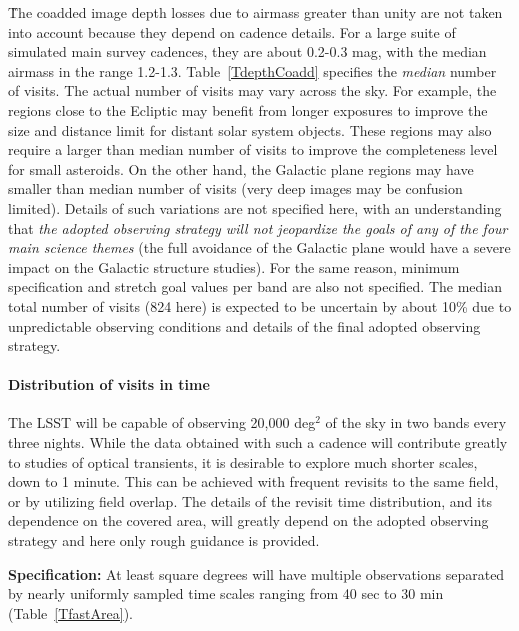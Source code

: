 \G{The coadded image depth losses due to airmass greater than unity are not
taken into account because they depend on cadence details. For a large suite
of simulated main survey cadences, they are about 0.2-0.3 mag, with the median airmass in
the range 1.2-1.3.}
Table~\ref{TdepthCoadd} specifies the {\it median} number of visits. The actual
number of visits may vary across the sky. For example, the regions close to
the Ecliptic may benefit from longer exposures to improve the size and distance
limit for distant solar system objects. These regions may also require a
larger than median number of visits to improve
the completeness level for small asteroids. On the other hand, the Galactic
plane regions may have smaller than median number of visits (\eg very deep
images may be confusion limited). Details of such variations are not specified
here, with an understanding that {\it the adopted observing strategy will not
jeopardize the goals of any of the four main science themes} (\eg the full
avoidance of the Galactic plane would have a severe impact on the Galactic
structure studies). For the same reason, minimum specification
and stretch goal values per band are also not specified. The median total number of visits
(824 here) is expected to be uncertain by about 10\% due to unpredictable
observing conditions and details of the final adopted observing strategy.



\paragraph{Distribution of visits in time\\}

The LSST will be capable of observing 20,000 deg$^2$ of the sky in two
bands every three nights. While the data obtained with such a cadence will
contribute greatly to studies of optical transients, it is desirable to
explore much shorter scales, down to 1 minute. This can be achieved with
frequent revisits to the same field, or by utilizing field overlap.  The
details of the revisit time distribution, and its dependence on the covered
area, will greatly depend on the adopted observing strategy and here only
rough guidance is provided.

{\bf Specification:} At least
square degrees will have multiple observations separated by nearly uniformly
sampled time scales ranging from 40 sec to 30 min (Table~\ref{TfastArea}).


